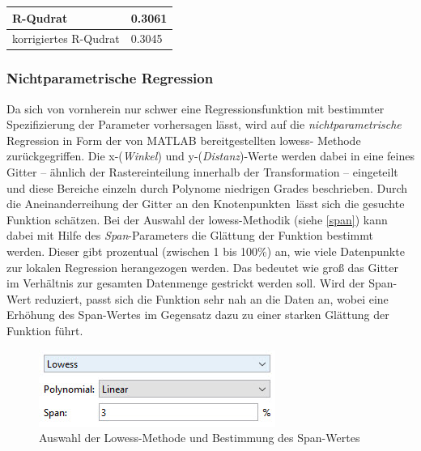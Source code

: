 \tablehead{}
\tabletail{}
\tablelasttail{}
\begin{center}%
\begin{supertabular}{ | P{6cm} | P{3cm}  |}
\textsf{R-Qudrat} 	& 0.3061	\\
\hline
\textsf{korrigiertes R-Qudrat} 	&  0.3045	\\
\hline
\end{supertabular}
\end{center}

\subsubsection{Nichtparametrische Regression}
\label{wdnr}
Da sich von vornherein nur schwer eine Regressionsfunktion mit bestimmter Spezifizierung der Parameter vorhersagen lässt, wird auf die \textit{nichtparametrische} Regression in Form der von MATLAB bereitgestellten \gls{lowess}- Methode zurückgegriffen. Die x-(\textit{Winkel}) und y-(\textit{Distanz})-Werte werden dabei in eine feines Gitter -- ähnlich der Rastereinteilung innerhalb der Transformation -- eingeteilt und diese Bereiche einzeln durch Polynome niedrigen Grades beschrieben. Durch die Aneinanderreihung der Gitter an den \glqq Knotenpunkten\grqq~lässt sich die gesuchte Funktion schätzen. Bei der Auswahl der \gls{lowess}-Methodik (siehe \vref{span}) kann dabei mit Hilfe des \textit{Span}-Parameters die Glättung der Funktion bestimmt werden. Dieser gibt prozentual (zwischen 1 bis 100\%) an, wie viele Datenpunkte zur lokalen Regression herangezogen werden. Das bedeutet wie groß das Gitter im Verhältnis zur gesamten Datenmenge gestrickt werden soll. Wird der Span-Wert reduziert, passt sich die Funktion sehr nah an die Daten an, wobei eine Erhöhung des Span-Wertes im Gegensatz dazu zu einer starken Glättung der Funktion führt.

\begin{figure}[H]
\centering
\includegraphics[scale=0.9]{se-wa-jpg/span}
\caption{Auswahl der Lowess-Methode und Bestimmung des Span-Wertes}
\label{span}
\end{figure}


